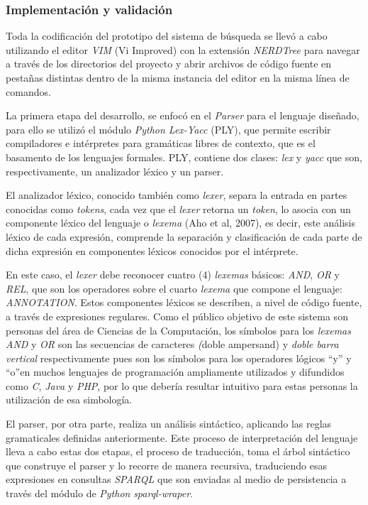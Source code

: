 \begin{itemize}
\subsubsection{Implementación y validación}
Toda la codificación del prototipo del sistema de búsqueda se llevó a cabo utilizando el editor \textit{VIM} (Vi Improved) con la extensión \textit{NERDTree} para navegar a través de los directorios del proyecto y abrir archivos de código fuente en pestañas distintas dentro de la misma instancia del editor en la misma línea de comandos.

La primera etapa del desarrollo, se enfocó en el \textit{Parser} para el lenguaje diseñado, para ello se utilizó el módulo \textit{Python Lex-Yacc} (PLY), que permite escribir compiladores e intérpretes para gramáticas libres de contexto, que es el basamento de los lenguajes formales. PLY, contiene dos clases: \textit{lex} y \textit{yacc} que son, respectivamente, un analizador léxico y un parser.

El analizador léxico, conocido también como \textit{lexer}, separa la entrada en partes conocidas como \textit{tokens}, cada vez que el \textit{lexer} retorna un \textit{token}, lo asocia con un componente léxico del lenguaje o \textit{lexema} (Aho et al, 2007), es decir, este análisis léxico de cada expresión, comprende la separación y clasificación de cada parte de dicha expresión en componentes léxicos conocidos por el intérprete.

En este caso, el \textit{lexer} debe reconocer cuatro (4) \textit{lexemas} básicos: \textit{AND}, \textit{OR} y \textit{REL}, que son los operadores sobre el cuarto \textit{lexema} que compone el lenguaje: \textit{ANNOTATION}. Estos componentes léxicos se describen, a nivel de código fuente, a través de expresiones regulares. Como el público objetivo de este sistema son personas del área de Ciencias de la Computación, los símbolos para los \textit{lexemas} \textit{AND} y \textit{OR} son las secuencias de caracteres \textit(doble ampersand) y \textit{doble barra vertical} respectivamente pues son los símbolos para los operadores lógicos ``y'' y ``o''en muchos lenguajes de programación ampliamente utilizados y difundidos como \textit{C}, \textit{Java} y \textit{PHP}, por lo que debería resultar intuitivo para estas personas la utilización de esa simbología.

El parser, por otra parte, realiza un análisis sintáctico, aplicando las reglas gramaticales definidas anteriormente. Este proceso de interpretación del lenguaje lleva a cabo estas dos etapas, el proceso de traducción, toma el árbol sintáctico que construye el parser y lo recorre de manera recursiva, traduciendo esas expresiones en consultas \textit{SPARQL} que son enviadas al medio de persistencia a través del módulo de \textit{Python} \textit{sparql-wraper}.


\end{itemize}

